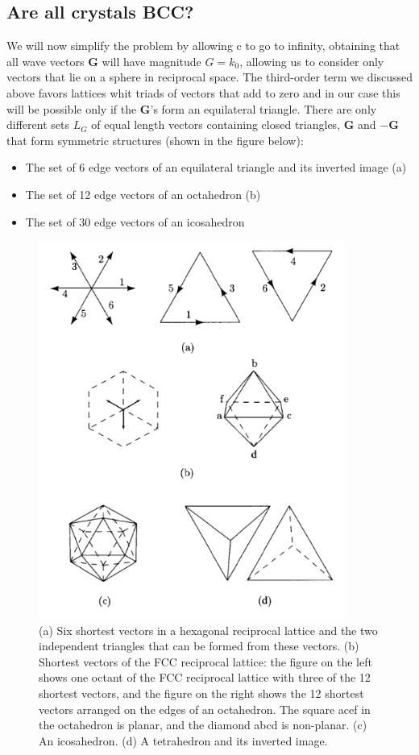 \documentclass[12pt,a4paper]{article}
\begin{document}
\subsection{Are all crystals BCC?}
We will now simplify the problem by allowing c to go to infinity, obtaining that all wave vectors $\textbf{G}$ will have magnitude $G=k_0$, allowing us to consider only vectors that lie on a sphere in reciprocal space. The third-order term we discussed above favors lattices whit triads of vectors that add to zero and in our case this will be possible only if the $\textbf{G}$'s form an equilateral triangle. There are only different sets $L_G$ of equal length vectors containing closed triangles, $\textbf{G}$ and $-\textbf{G}$ that form symmetric structures (shown in the figure below):
\begin{itemize}
\item The set of 6 edge vectors of an equilateral triangle and its inverted image (a)
\item The set of 12 edge vectors of an octahedron (b)
\item The set of 30 edge vectors of an icosahedron
\end{itemize}
\begin{figure}[h!]
\begin{center}
\includegraphics[width=10cm]{robi.png}
\end{center}
\caption{(a) Six shortest vectors in a hexagonal reciprocal lattice and the two independent triangles that can be formed from these vectors. (b) Shortest vectors of the FCC reciprocal lattice: the figure on the left shows one octant of the FCC reciprocal lattice with three of the 12 shortest vectors, and the figure on the right shows the 12 shortest vectors arranged on the edges of an octahedron. The square acef in the octahedron is planar, and the diamond abcd is non-planar. (c) An icosahedron. (d) A tetrahedron and its inverted image.}
\label{fig:robi}
\end{figure}
\end{document}
